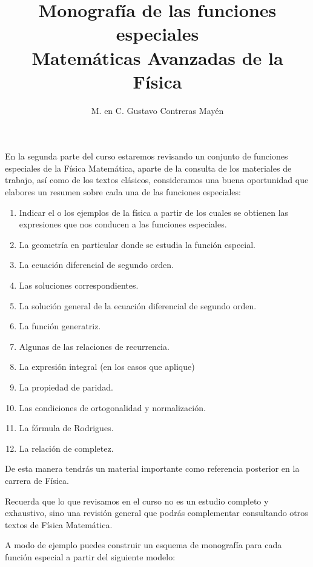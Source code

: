 
\usepackage{apacite}
\title{Monografía de las funciones especiales \\ \large {Matemáticas Avanzadas de la Física} \vspace{-3ex}}
\author{M. en C. Gustavo Contreras Mayén}
\date{ }

\vspace{-4cm}
\maketitle
\fontsize{14}{14}\selectfont
En la segunda parte del curso estaremos revisando un conjunto de funciones especiales de la Física Matemática, aparte de la consulta de los materiales de trabajo, así como de los textos clásicos, consideramos una buena oportunidad que elabores un resumen sobre cada una de las funciones especiales:
\begin{enumerate}
\item Indicar el o los ejemplos de la física a partir de los cuales se obtienen las expresiones que nos conducen a las funciones especiales.
\item La geometría en particular donde se estudia la función especial.
\item La ecuación diferencial de segundo orden.
\item Las soluciones correspondientes.
\item La solución general de la ecuación diferencial de segundo orden.
\item La función generatriz.
\item Algunas de las relaciones de recurrencia.
\item La expresión integral (en los casos que aplique)
\item La propiedad de paridad.
\item Las condiciones de ortogonalidad y normalización.
\item La fórmula de Rodrigues.
\item La relación de completez.
\end{enumerate}
De esta manera tendrás un material importante como referencia posterior en la carrera de Física.
\par
Recuerda que lo que revisamos en el curso no es un estudio completo y exhaustivo, sino una revisión general que podrás complementar consultando otros textos de Física Matemática.
\par
A modo de ejemplo puedes construir un esquema de monografía para cada función especial a partir del siguiente modelo:

